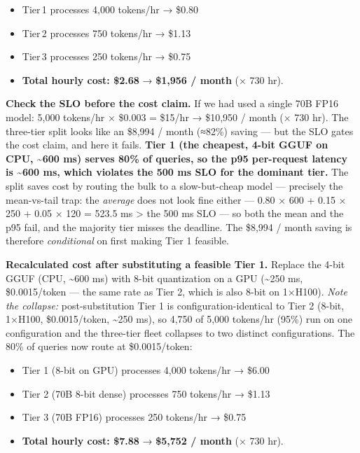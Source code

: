 \begin{itemize}
\tightlist
\item
  Tier\,1 processes 4,000 tokens/hr → \$0.80
\item
  Tier\,2 processes 750 tokens/hr → \$1.13
\item
  Tier\,3 processes 250 tokens/hr → \$0.75
\item
  \textbf{Total hourly cost: \$2.68} → \textbf{\$1,956 / month} (× 730
  hr).
\end{itemize}

\textbf{Check the SLO before the cost claim.} If we had used a single
70B FP16 model: 5,000 tokens/hr × \$0.003 = \$15/hr → \$10,950 / month
(× 730 hr). The three-tier split looks like an \$8,994 / month (≈82\%)
saving --- but the SLO gates the cost claim, and here it fails.
\textbf{Tier 1 (the cheapest, 4-bit GGUF on CPU, \textasciitilde600 ms)
serves 80\% of queries, so the p95 per-request latency is
\textasciitilde600 ms, which violates the 500 ms SLO for the dominant
tier.} The split saves cost by routing the bulk to a slow-but-cheap
model --- precisely the mean-vs-tail trap: the \emph{average} does not
look fine either --- 0.80 × 600 + 0.15 × 250 + 0.05 × 120 = 523.5 ms
\textgreater{} the 500 ms SLO --- so both the mean and the p95 fail, and
the majority tier misses the deadline. The \$8,994 / month saving is
therefore \emph{conditional} on first making Tier 1 feasible.

\textbf{Recalculated cost after substituting a feasible Tier 1.} Replace
the 4-bit GGUF (CPU, \textasciitilde600 ms) with 8-bit quantization on a
GPU (\textasciitilde250 ms, \$0.0015/token --- the same rate as Tier 2,
which is also 8-bit on 1×H100). \emph{Note the collapse:}
post-substitution Tier 1 is configuration-identical to Tier 2 (8-bit,
1×H100, \$0.0015/token, \textasciitilde250 ms), so 4,750 of 5,000
tokens/hr (95\%) run on one configuration and the three-tier fleet
collapses to two distinct configurations. The 80\% of queries now route
at \$0.0015/token:

\begin{itemize}
\tightlist
\item
  Tier 1 (8-bit on GPU) processes 4,000 tokens/hr → \$6.00
\item
  Tier 2 (70B 8-bit dense) processes 750 tokens/hr → \$1.13
\item
  Tier 3 (70B FP16) processes 250 tokens/hr → \$0.75
\item
  \textbf{Total hourly cost: \$7.88} → \textbf{\$5,752 / month} (× 730
  hr).
\end{itemize}

